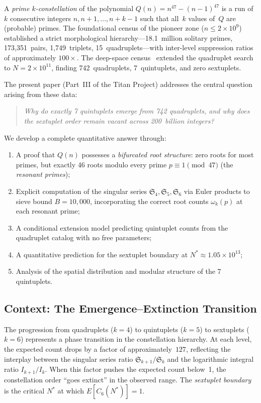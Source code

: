 \documentclass[11pt,a4paper]{article}
\begin{document}
A \emph{prime $k$-constellation} of the polynomial
$Q(n) = n^{47} - (n{-}1)^{47}$ is a run of~$k$ consecutive integers
$n, n{+}1, \ldots, n{+}k{-}1$ such that all~$k$ values of~$Q$ are
(probable) primes.  The foundational census of the pioneer zone
($n \leq 2 \times 10^9$)~\cite{Chen2026a} established a strict
morphological hierarchy---18.1~million solitary primes, 173{,}351~pairs,
1{,}749~triplets, 15~quadruplets---with inter-level suppression ratios
of approximately $100{\times}$.  The deep-space census~\cite{Chen2026b}
extended the quadruplet search to $N = 2 \times 10^{11}$, finding
742~quadruplets, 7~quintuplets, and zero sextuplets.

The present paper (Part~III of the Titan Project) addresses the
central question arising from these data:
\begin{quote}
\itshape Why do exactly 7 quintuplets emerge from 742 quadruplets,
and why does the sextuplet order remain vacant across 200~billion integers?
\end{quote}
We develop a complete quantitative answer through:
\begin{enumerate}[label=(\roman*)]
  \item A proof that $Q(n)$ possesses a \emph{bifurcated root structure}:
    zero roots for most primes, but exactly 46 roots modulo every
    prime $p \equiv 1 \pmod{47}$ (the \emph{resonant primes});
  \item Explicit computation of the singular series
    $\mathfrak{S}_4, \mathfrak{S}_5, \mathfrak{S}_6$ via Euler products
    to sieve bound $B = 10{,}000$, incorporating the correct
    root counts $\omega_k(p)$ at each resonant prime;
  \item A conditional extension model predicting quintuplet counts from
    the quadruplet catalog with no free parameters;
  \item A quantitative prediction for the sextuplet boundary at
    $N^* \approx 1.05 \times 10^{13}$;
  \item Analysis of the spatial distribution and modular structure of
    the 7 quintuplets.
\end{enumerate}

\subsection{Context: The Emergence--Extinction Transition}

The progression from quadruplets ($k = 4$) to quintuplets ($k = 5$)
to sextuplets ($k = 6$) represents a phase transition in the
constellation hierarchy.  At each level, the expected count drops by
a factor of approximately~$127$, reflecting the interplay between the
singular series ratio $\mathfrak{S}_{k+1}/\mathfrak{S}_k$ and the
logarithmic integral ratio $I_{k+1}/I_k$.
When this factor pushes the expected count below~1, the constellation
order ``goes extinct'' in the observed range.  The \emph{sextuplet
boundary} is the critical $N^*$ at which $E[C_6(N^*)] = 1$.
\end{document}
